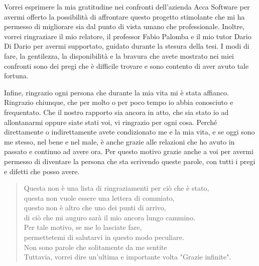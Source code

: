 Vorrei esprimere la mia gratitudine nei confronti dell'azienda Acca Software per avermi offerto la possibilità di affrontare questo progetto stimolante che mi ha permesso di migliorare sia dal punto di vista umano che professionale. Inoltre, vorrei ringraziare il mio relatore, il professor Fabio Palomba e il mio tutor Dario Di Dario per avermi supportato, guidato durante la stesura della tesi. I modi di fare, la gentilezza, la disponibilità e la bravura che avete mostrato nei miei confronti sono dei pregi che è difficile trovare e sono contento di aver avuto tale fortuna.

Infine, ringrazio ogni persona che durante la mia vita mi è stata affianco. Ringrazio chiunque, che per molto o per poco tempo io abbia conosciuto e frequentato. Che il nostro rapporto sia ancora in atto, che sia stato io ad allontanarmi oppure siate stati voi, vi ringrazio per ogni cosa. Perché direttamente o indirettamente avete condizionato me e la mia vita, e se oggi sono me stesso, nel bene e nel male, è anche grazie alle relazioni che ho avuto in passato e continuo ad avere ora. Per questo motivo grazie anche a voi per avermi permesso di diventare la persona che sta scrivendo queste parole, con tutti i pregi e difetti che posso avere.

\begin{verse}
Questa non è una lista di ringraziamenti per ciò che è stato,\\
questa non vuole essere una lettera di commiato,\\
questo non è altro che uno dei punti di arrivo,\\
di ciò che mi auguro sarà il mio ancora lungo cammino.\\
Per tale motivo, se me lo lasciate fare,\\
permettetemi di salutarvi in questo modo peculiare.\\
Non sono parole che solitamente da me sentite\\
Tuttavia, vorrei dire un'ultima e importante volta "Grazie infinite".
\end{verse}